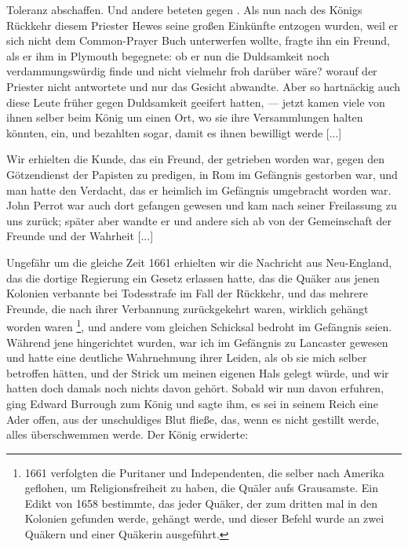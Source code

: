 Toleranz abschaffen. Und andere beteten gegen . Als nun nach des Königs Rückkehr
diesem Priester Hewes seine großen Einkünfte entzogen wurden,
weil er sich nicht dem Common-Prayer Buch unterwerfen wollte,
fragte ihn ein Freund, als er ihm in Plymouth begegnete: ob er
nun die Duldsamkeit noch verdammungswürdig finde und nicht
vielmehr froh darüber wäre? worauf der Priester nicht antwortete
und nur das Gesicht abwandte. Aber so hartnäckig auch diese
Leute früher gegen Duldsamkeit geeifert hatten, — jetzt kamen
viele von ihnen selber beim König um einen Ort, wo sie ihre
Versammlungen halten könnten, ein, und bezahlten sogar, damit
es ihnen bewilligt werde [...]

Wir erhielten die Kunde, das ein Freund, der getrieben worden
war, gegen den Götzendienst der Papisten zu predigen, in Rom
im Gefängnis gestorben war, und man hatte den Verdacht, das
er heimlich im Gefängnis umgebracht worden war. John Perrot 
war auch dort gefangen gewesen und kam nach seiner Freilassung
zu uns zurück; später aber wandte er und andere sich ab von
der Gemeinschaft der Freunde und der Wahrheit [...]

Ungefähr um die gleiche Zeit 1661 erhielten wir die Nachricht 
aus Neu-England, das die dortige Regierung ein Gesetz
erlassen hatte, das die Quäker aus jenen Kolonien verbannte bei
Todesstrafe im Fall der Rückkehr, und das mehrere Freunde, die
nach ihrer Verbannung zurückgekehrt waren, wirklich gehängt
worden waren \footnote{1661 verfolgten die Puritaner und 
Independenten, die selber nach Amerika geflohen, um 
Religionsfreiheit zu haben, die Quäler aufs Grausamste.
Ein Edikt von 1658 bestimmte, das jeder Quäker, der zum dritten 
mal in den Kolonien gefunden werde, gehängt werde, und 
dieser Befehl wurde an zwei Quäkern und einer Quäkerin 
ausgeführt.}, und andere vom gleichen Schicksal bedroht im
Gefängnis seien. Während jene hingerichtet wurden, war ich im
Gefängnis zu Lancaster gewesen und hatte eine deutliche Wahrnehmung 
ihrer Leiden, als ob sie mich selber betroffen hätten,
und der Strick um meinen eigenen Hals gelegt würde, und wir
hatten doch damals noch nichts davon gehört. Sobald wir nun
davon erfuhren, ging Edward Burrough zum König und sagte
ihm, es sei in seinem Reich eine Ader offen, aus der unschuldiges
Blut fließe, das, wenn es nicht gestillt werde, alles überschwemmen
werde. Der König erwiderte: 